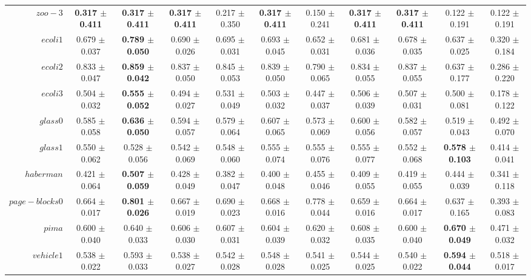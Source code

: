 \begin{table}[!ht]
{\begin{tabular}{r c c c c c c c c c c}
$zoo-3$ & \textbf{0.317 $\pm$ 0.411} & \textbf{0.317 $\pm$ 0.411} & \textbf{0.317 $\pm$ 0.411} & 0.217 $\pm$ 0.350 & \textbf{0.317 $\pm$ 0.411} & 0.150 $\pm$ 0.241 & \textbf{0.317 $\pm$ 0.411} & \textbf{0.317 $\pm$ 0.411} & 0.122 $\pm$ 0.191 & 0.122 $\pm$ 0.191 \\
$ecoli1$ & 0.679 $\pm$ 0.037 & \textbf{0.789 $\pm$ 0.050} & 0.690 $\pm$ 0.026 & 0.695 $\pm$ 0.031 & 0.693 $\pm$ 0.045 & 0.652 $\pm$ 0.031 & 0.681 $\pm$ 0.036 & 0.678 $\pm$ 0.035 & 0.637 $\pm$ 0.025 & 0.320 $\pm$ 0.184 \\
$ecoli2$ & 0.833 $\pm$ 0.047 & \textbf{0.859 $\pm$ 0.042} & 0.837 $\pm$ 0.050 & 0.845 $\pm$ 0.053 & 0.839 $\pm$ 0.050 & 0.790 $\pm$ 0.065 & 0.834 $\pm$ 0.055 & 0.837 $\pm$ 0.055 & 0.637 $\pm$ 0.177 & 0.286 $\pm$ 0.220 \\
$ecoli3$ & 0.504 $\pm$ 0.032 & \textbf{0.555 $\pm$ 0.052} & 0.494 $\pm$ 0.027 & 0.531 $\pm$ 0.049 & 0.503 $\pm$ 0.032 & 0.447 $\pm$ 0.037 & 0.506 $\pm$ 0.039 & 0.507 $\pm$ 0.031 & 0.500 $\pm$ 0.081 & 0.178 $\pm$ 0.122 \\
$glass0$ & 0.585 $\pm$ 0.058 & \textbf{0.636 $\pm$ 0.050} & 0.594 $\pm$ 0.057 & 0.579 $\pm$ 0.064 & 0.607 $\pm$ 0.065 & 0.573 $\pm$ 0.069 & 0.600 $\pm$ 0.056 & 0.582 $\pm$ 0.057 & 0.519 $\pm$ 0.043 & 0.492 $\pm$ 0.070 \\
$glass1$ & 0.550 $\pm$ 0.062 & 0.528 $\pm$ 0.056 & 0.542 $\pm$ 0.069 & 0.548 $\pm$ 0.060 & 0.555 $\pm$ 0.074 & 0.555 $\pm$ 0.076 & 0.555 $\pm$ 0.077 & 0.552 $\pm$ 0.068 & \textbf{0.578 $\pm$ 0.103} & 0.414 $\pm$ 0.041 \\
$haberman$ & 0.421 $\pm$ 0.064 & \textbf{0.507 $\pm$ 0.059} & 0.428 $\pm$ 0.049 & 0.382 $\pm$ 0.047 & 0.400 $\pm$ 0.048 & 0.455 $\pm$ 0.046 & 0.409 $\pm$ 0.055 & 0.419 $\pm$ 0.055 & 0.444 $\pm$ 0.039 & 0.341 $\pm$ 0.118 \\
$page-blocks0$ & 0.664 $\pm$ 0.017 & \textbf{0.801 $\pm$ 0.026} & 0.667 $\pm$ 0.019 & 0.690 $\pm$ 0.023 & 0.668 $\pm$ 0.016 & 0.778 $\pm$ 0.044 & 0.659 $\pm$ 0.016 & 0.664 $\pm$ 0.017 & 0.637 $\pm$ 0.165 & 0.393 $\pm$ 0.083 \\
$pima$ & 0.600 $\pm$ 0.040 & 0.640 $\pm$ 0.033 & 0.606 $\pm$ 0.030 & 0.607 $\pm$ 0.031 & 0.604 $\pm$ 0.039 & 0.620 $\pm$ 0.032 & 0.608 $\pm$ 0.035 & 0.600 $\pm$ 0.040 & \textbf{0.670 $\pm$ 0.049} & 0.471 $\pm$ 0.032 \\
$vehicle1$ & 0.538 $\pm$ 0.022 & 0.593 $\pm$ 0.033 & 0.538 $\pm$ 0.027 & 0.542 $\pm$ 0.028 & 0.548 $\pm$ 0.028 & 0.541 $\pm$ 0.025 & 0.544 $\pm$ 0.025 & 0.540 $\pm$ 0.022 & \textbf{0.594 $\pm$ 0.044} & 0.518 $\pm$ 0.017 \\

\end{tabular}}
\end{table}
